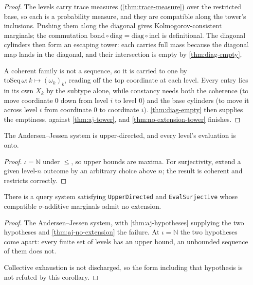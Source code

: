 \begin{proof}
\leanok
{}
The levels carry trace measures (\ref{thm:trace-measure}) over the restricted
base, so each is a probability measure, and they are compatible along the
tower's inclusions. Pushing them along the diagonal gives Kolmogorov-consistent
marginals; the commutation $\mathrm{bond} \circ \mathrm{diag} = \mathrm{diag}
\circ \mathrm{incl}$ is definitional. The diagonal cylinders then form an
escaping tower: each carries full mass because the diagonal map lands in the
diagonal, and their intersection is empty by \ref{thm:diag-empty}.

A coherent family is not a sequence, so it is carried to one by
$\mathrm{toSeq}\,\omega : k \mapsto (\omega_k)_k$, reading off the top
coordinate at each level. Every entry lies in its own $X_k$ by the subtype
alone, while constancy needs both the coherence (to move coordinate $0$ down
from level $i$ to level $0$) and the base cylinders (to move it across level $i$
from coordinate $0$ to coordinate $i$). \ref{thm:diag-empty} then supplies the
emptiness, against \ref{thm:aj-tower}, and \ref{thm:no-extension-tower}
finishes.
\end{proof}

\begin{theorem}
\label{thm:aj-hypotheses}
\leanok
The Andersen--Jessen system is upper-directed, and every level's evaluation is
onto.
\end{theorem}

\begin{proof}
\leanok
$\iota = \mathbb{N}$ under $\leq$, so upper bounds are maxima. For surjectivity,
extend a given level-$n$ outcome by an arbitrary choice above $n$; the result is
coherent and restricts correctly.
\end{proof}

\begin{corollary}
\label{cor:upper-directed-false}
\leanok
There is a query system satisfying \texttt{UpperDirected} and
\texttt{EvalSurjective} whose compatible $\sigma$-additive marginals admit no
extension.
\end{corollary}

\begin{proof}
\leanok
{}
The Andersen--Jessen system, with \ref{thm:aj-hypotheses} supplying the two
hypotheses and \ref{thm:aj-no-extension} the failure. At $\iota = \mathbb{N}$
the two hypotheses come apart: every finite set of levels has an upper bound, an
unbounded sequence of them does not.

Collective exhaustion is not discharged, so the form including that hypothesis
is not refuted by this corollary.
\end{proof}

